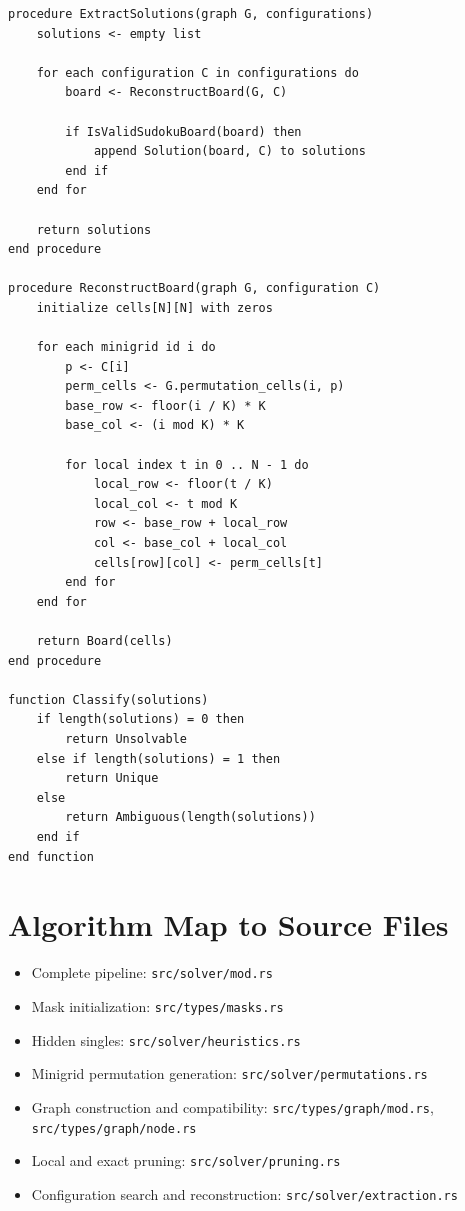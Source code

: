 \documentclass[11pt,a4paper]{article}
\begin{document}
\begin{lstlisting}[caption={Extract and validate solved boards}]
procedure ExtractSolutions(graph G, configurations)
    solutions <- empty list

    for each configuration C in configurations do
        board <- ReconstructBoard(G, C)

        if IsValidSudokuBoard(board) then
            append Solution(board, C) to solutions
        end if
    end for

    return solutions
end procedure

procedure ReconstructBoard(graph G, configuration C)
    initialize cells[N][N] with zeros

    for each minigrid id i do
        p <- C[i]
        perm_cells <- G.permutation_cells(i, p)
        base_row <- floor(i / K) * K
        base_col <- (i mod K) * K

        for local index t in 0 .. N - 1 do
            local_row <- floor(t / K)
            local_col <- t mod K
            row <- base_row + local_row
            col <- base_col + local_col
            cells[row][col] <- perm_cells[t]
        end for
    end for

    return Board(cells)
end procedure

function Classify(solutions)
    if length(solutions) = 0 then
        return Unsolvable
    else if length(solutions) = 1 then
        return Unique
    else
        return Ambiguous(length(solutions))
    end if
end function
\end{lstlisting}

\section{Algorithm Map to Source Files}

\begin{itemize}
    \item Complete pipeline: \texttt{src/solver/mod.rs}
    \item Mask initialization: \texttt{src/types/masks.rs}
    \item Hidden singles: \texttt{src/solver/heuristics.rs}
    \item Minigrid permutation generation: \texttt{src/solver/permutations.rs}
    \item Graph construction and compatibility: \texttt{src/types/graph/mod.rs}, \texttt{src/types/graph/node.rs}
    \item Local and exact pruning: \texttt{src/solver/pruning.rs}
    \item Configuration search and reconstruction: \texttt{src/solver/extraction.rs}
\end{itemize}
\end{document}
